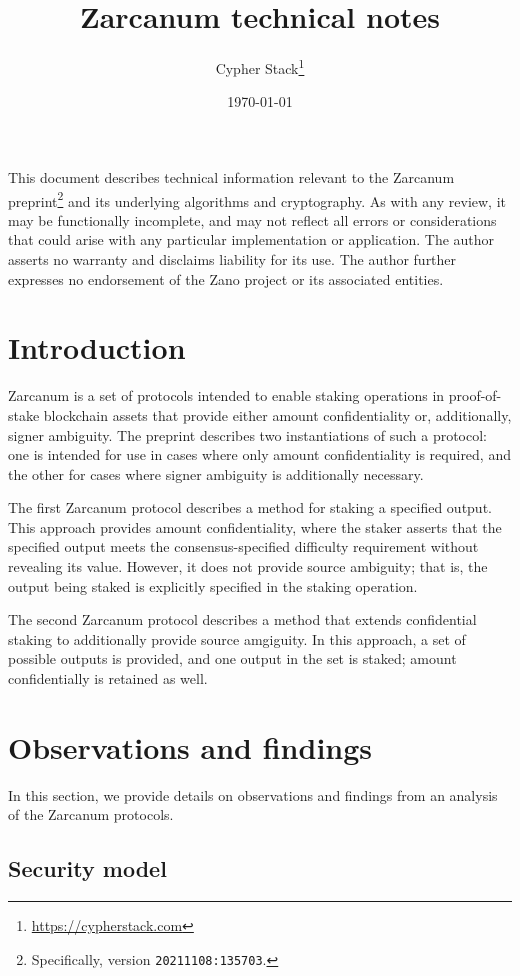 \documentclass{article}
\title{Zarcanum technical notes}
\author{Cypher Stack\thanks{\url{https://cypherstack.com}}}
\date{\today}
\begin{document}
	
\maketitle

This document describes technical information relevant to the Zarcanum \cite{zarcanum} preprint\footnote{Specifically, version \texttt{20211108:135703}.} and its underlying algorithms and cryptography.
As with any review, it may be functionally incomplete, and may not reflect all errors or considerations that could arise with any particular implementation or application.
The author asserts no warranty and disclaims liability for its use.
The author further expresses no endorsement of the Zano project or its associated entities.


\section{Introduction}

Zarcanum is a set of protocols intended to enable staking operations in proof-of-stake blockchain assets that provide either amount confidentiality or, additionally, signer ambiguity.
The preprint describes two instantiations of such a protocol: one is intended for use in cases where only amount confidentiality is required, and the other for cases where signer ambiguity is additionally necessary.

The first Zarcanum protocol describes a method for staking a specified output.
This approach provides amount confidentiality, where the staker asserts that the specified output meets the consensus-specified difficulty requirement without revealing its value.
However, it does not provide source ambiguity; that is, the output being staked is explicitly specified in the staking operation.

The second Zarcanum protocol describes a method that extends confidential staking to additionally provide source amgiguity.
In this approach, a set of possible outputs is provided, and one output in the set is staked; amount confidentially is retained as well.


\section{Observations and findings}

In this section, we provide details on observations and findings from an analysis of the Zarcanum protocols.

\subsection{Security model}
\end{document}
